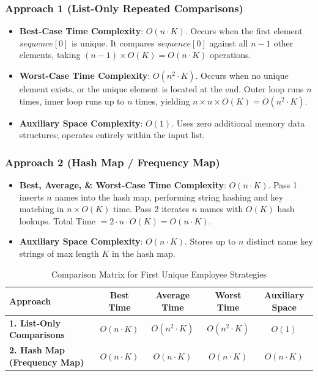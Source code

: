 \subsubsection{Approach 1 (List-Only Repeated Comparisons)}
\begin{itemize}
    \item \textbf{Best-Case Time Complexity}: $O(n \cdot K)$.
    Occurs when the first element $sequence[0]$ is unique. It compares $sequence[0]$ against all $n-1$ other elements, taking $(n-1) \times O(K) = O(n \cdot K)$ operations.
    
    \item \textbf{Worst-Case Time Complexity}: $O(n^2 \cdot K)$.
    Occurs when no unique element exists, or the unique element is located at the end. Outer loop runs $n$ times, inner loop runs up to $n$ times, yielding $n \times n \times O(K) = O(n^2 \cdot K)$.
    
    \item \textbf{Auxiliary Space Complexity}: $O(1)$.
    Uses zero additional memory data structures; operates entirely within the input list.
\end{itemize}

\subsubsection{Approach 2 (Hash Map / Frequency Map)}
\begin{itemize}
    \item \textbf{Best, Average, \& Worst-Case Time Complexity}: $O(n \cdot K)$.
    Pass 1 inserts $n$ names into the hash map, performing string hashing and key matching in $n \times O(K)$ time. Pass 2 iterates $n$ names with $O(K)$ hash lookups. Total Time $= 2 \cdot n \cdot O(K) = O(n \cdot K)$.
    
    \item \textbf{Auxiliary Space Complexity}: $O(n \cdot K)$.
    Stores up to $n$ distinct name key strings of max length $K$ in the hash map.
\end{itemize}

\begin{table}[htbp]
\centering
\small
\caption{Comparison Matrix for First Unique Employee Strategies}
\label{tab:problem3_complexity}
\begin{tabularx}{\textwidth}{@{} >{\raggedright\arraybackslash}X c c c c @{}}
\toprule
\textbf{Approach} & \textbf{Best Time} & \textbf{Average Time} & \textbf{Worst Time} & \textbf{Auxiliary Space} \\
\midrule
\textbf{1. List-Only Comparisons} & $O(n \cdot K)$ & $O(n^2 \cdot K)$ & $O(n^2 \cdot K)$ & $O(1)$ \\
\textbf{2. Hash Map (Frequency Map)} & $O(n \cdot K)$ & $O(n \cdot K)$ & $O(n \cdot K)$ & $O(n \cdot K)$ \\
\bottomrule
\end{tabularx}
\end{table}

